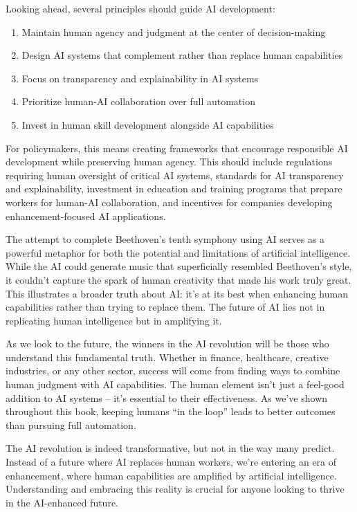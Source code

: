 \documentclass[
  Letterpaper,
]{scrbook}
\providecommand{\tightlist}{%
  \setlength{\itemsep}{0pt}\setlength{\parskip}{0pt}}\usepackage{longtable,booktabs,array}
\begin{document}
Looking ahead, several principles should guide AI development:

\begin{enumerate}
\def\labelenumi{\arabic{enumi}.}
\tightlist
\item
  Maintain human agency and judgment at the center of decision-making
\item
  Design AI systems that complement rather than replace human
  capabilities
\item
  Focus on transparency and explainability in AI systems
\item
  Prioritize human-AI collaboration over full automation
\item
  Invest in human skill development alongside AI capabilities
\end{enumerate}

For policymakers, this means creating frameworks that encourage
responsible AI development while preserving human agency. This should
include regulations requiring human oversight of critical AI systems,
standards for AI transparency and explainability, investment in
education and training programs that prepare workers for human-AI
collaboration, and incentives for companies developing
enhancement-focused AI applications.

The attempt to complete Beethoven's tenth symphony using AI serves as a
powerful metaphor for both the potential and limitations of artificial
intelligence. While the AI could generate music that superficially
resembled Beethoven's style, it couldn't capture the spark of human
creativity that made his work truly great. This illustrates a broader
truth about AI: it's at its best when enhancing human capabilities
rather than trying to replace them. The future of AI lies not in
replicating human intelligence but in amplifying it.

As we look to the future, the winners in the AI revolution will be those
who understand this fundamental truth. Whether in finance, healthcare,
creative industries, or any other sector, success will come from finding
ways to combine human judgment with AI capabilities. The human element
isn't just a feel-good addition to AI systems -- it's essential to their
effectiveness. As we've shown throughout this book, keeping humans ``in
the loop'' leads to better outcomes than pursuing full automation.

The AI revolution is indeed transformative, but not in the way many
predict. Instead of a future where AI replaces human workers, we're
entering an era of enhancement, where human capabilities are amplified
by artificial intelligence. Understanding and embracing this reality is
crucial for anyone looking to thrive in the AI-enhanced future.
\end{document}
